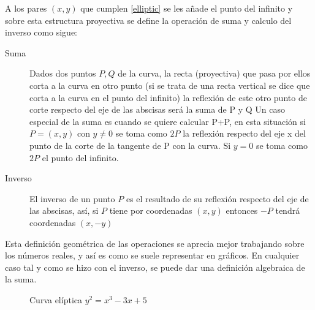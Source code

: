 A los pares $(x,y)$ que cumplen \ref{elliptic} se les añade el punto del infinito y sobre esta estructura proyectiva se define la operación de suma y calculo del inverso como sigue:
\begin{description}
\item [Suma]
Dados dos puntos $P, Q$ de la curva, la recta (proyectiva) que pasa por ellos corta a la curva en otro punto (si se trata de una recta vertical se dice que corta a la curva en el punto del infinito) la reflexión de este otro punto de corte respecto del eje de las abscisas será la suma de P y Q
Un caso especial de la suma es cuando se quiere calcular P+P, en esta situación si $P =(x,y)$ con $y \not= 0$ se toma como $2P$ la reflexión respecto del eje x del punto de la corte de la tangente de P con la curva. Si $y = 0$ se toma como $2P$ el punto del infinito.
\item [Inverso]
 El inverso de un punto $P$ es el resultado de su reflexión respecto del eje de las abscisas, así, si $P$ tiene por coordenadas $(x,y)$ entonces $-P$ tendrá coordenadas $(x,-y)$
\end{description}%
Esta definición geométrica de las operaciones se aprecia mejor trabajando sobre los números reales, y así es como se suele representar en gráficos. En cualquier caso tal y como se hizo con el inverso, se puede dar una definición algebraica de la suma.

\begin{figure}[H]
  \qquad
	\caption{Curva elíptica $y^2 = x^3 -3x + 5$}%
	\label{fig:test}%
\end{figure}


